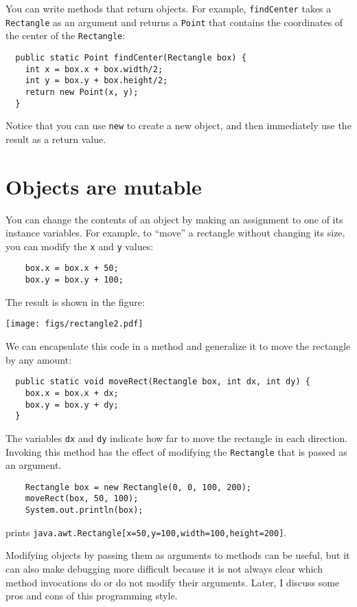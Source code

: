 \documentclass[12pt]{book}
\theoremstyle{definition}
\begin{document}
You can write methods that return objects.  For example,
{\tt findCenter} takes a {\tt Rectangle} as an argument and
returns a {\tt Point} that contains the coordinates of the
center of the {\tt Rectangle}:

\begin{lstlisting}
  public static Point findCenter(Rectangle box) {
    int x = box.x + box.width/2;
    int y = box.y + box.height/2;
    return new Point(x, y);
  }
\end{lstlisting}
%
Notice that you can use {\tt new} to create a new object,
and then immediately use the result as a return value.


\section{Objects are mutable}

You can change the contents of an object by making an assignment
to one of its instance variables.  For example, to ``move''
a rectangle without changing its size, you can modify the
{\tt x} and {\tt y} values:

\begin{lstlisting}
    box.x = box.x + 50;
    box.y = box.y + 100;
\end{lstlisting}
%
The result is shown in the figure:


\texttt{[image: figs/rectangle2.pdf]}



We can encapsulate this code in a method and
generalize it to move the rectangle by any amount:

\begin{lstlisting}
  public static void moveRect(Rectangle box, int dx, int dy) {
    box.x = box.x + dx;
    box.y = box.y + dy;
  }
\end{lstlisting}
%
The variables {\tt dx} and {\tt dy} indicate how far to move the
rectangle in each direction.  Invoking this method has the effect of
modifying the {\tt Rectangle} that is passed as an argument.

\begin{lstlisting}
    Rectangle box = new Rectangle(0, 0, 100, 200);
    moveRect(box, 50, 100);
    System.out.println(box);
\end{lstlisting}
%
prints {\tt java.awt.Rectangle[x=50,y=100,width=100,height=200]}.

Modifying objects by passing them as arguments to methods can be
useful, but it can also make debugging more difficult because it is
not always clear which method invocations do or do not modify their
arguments.  Later, I discuss some pros and cons of this
programming style.
\end{document}
